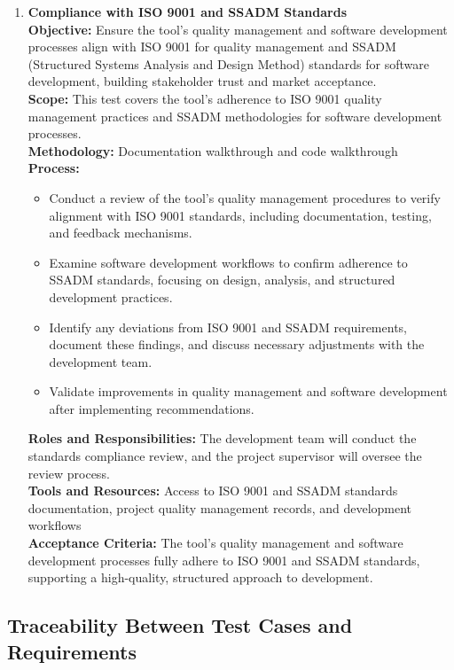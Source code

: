 \documentclass[12pt, titlepage]{article}
\begin{document}
\begin{enumerate}[label={\bf \textcolor{Maroon}{test-CPL-\arabic*}}, wide=0pt, font=\itshape]
\item \textbf{Compliance with ISO 9001 and SSADM Standards} \\[2mm]
    \textbf{Objective:} Ensure the tool’s quality management and software development processes align with ISO 9001 for quality management and SSADM (Structured Systems Analysis and Design Method) standards for software development, building stakeholder trust and market acceptance. \\[2mm]
    \textbf{Scope:} This test covers the tool’s adherence to ISO 9001 quality management practices and SSADM methodologies for software development processes. \\[2mm]
    \textbf{Methodology:} Documentation walkthrough and code walkthrough \\[2mm]
    \textbf{Process:}
    \begin{itemize}
      \item Conduct a review of the tool’s quality management procedures to verify alignment with ISO 9001 standards, including documentation, testing, and feedback mechanisms.
      \item Examine software development workflows to confirm adherence to SSADM standards, focusing on design, analysis, and structured development practices.
      \item Identify any deviations from ISO 9001 and SSADM requirements, document these findings, and discuss necessary adjustments with the development team.
      \item Validate improvements in quality management and software development after implementing recommendations.
    \end{itemize}
    \textbf{Roles and Responsibilities:} The development team will conduct the standards compliance review, and the project supervisor will oversee the review process. \\[2mm]
    \textbf{Tools and Resources:} Access to ISO 9001 and SSADM standards documentation, project quality management records, and development workflows \\[2mm]
    \textbf{Acceptance Criteria:} The tool’s quality management and software development processes fully adhere to ISO 9001 and SSADM standards, supporting a high-quality, structured approach to development.
\end{enumerate}

\subsection{Traceability Between Test Cases and Requirements} \label{trace-sys}
\end{document}

